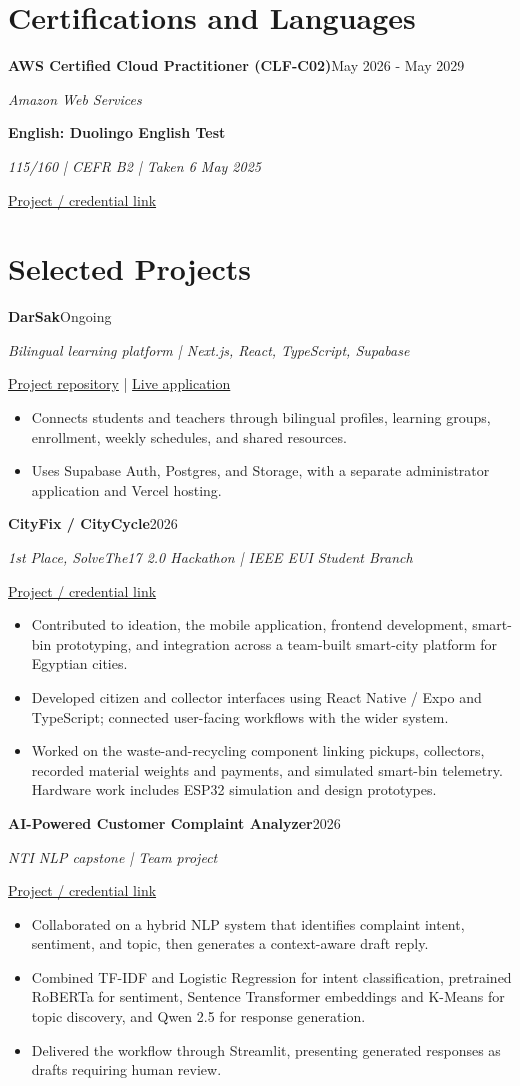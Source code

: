 \documentclass[10pt,a4paper]{article}
\newcommand{\cvitem}[3]{\par\addvspace{4pt}\textbf{#1}\hfill{\small #3}\par{\small\textit{#2}}\par}
\begin{document}
\section*{Certifications and Languages}
\cvitem{AWS Certified Cloud Practitioner (CLF-C02)}{Amazon Web Services}{May 2026 - May 2029}
\cvitem{English: Duolingo English Test}{115/160 | CEFR B2 | Taken 6 May 2025}{}
{\small\href{https://certs.duolingo.com/3nzcfz1rk1r8p002}{Project / credential link}}
\newpage
\section*{Selected Projects}
\cvitem{DarSak}{Bilingual learning platform | Next.js, React, TypeScript, Supabase}{Ongoing}
{\small\href{https://github.com/abdulrahman-111/DarSak}{Project repository} | \href{https://darsak-platform.vercel.app}{Live application}}
\begin{itemize}
\item Connects students and teachers through bilingual profiles, learning groups, enrollment, weekly schedules, and shared resources.
\item Uses Supabase Auth, Postgres, and Storage, with a separate administrator application and Vercel hosting.
\end{itemize}
\cvitem{CityFix / CityCycle}{1st Place, SolveThe17 2.0 Hackathon | IEEE EUI Student Branch}{2026}
{\small\href{https://github.com/abdulrahman-111/cityFix}{Project / credential link}}
\begin{itemize}
\item Contributed to ideation, the mobile application, frontend development, smart-bin prototyping, and integration across a team-built smart-city platform for Egyptian cities.
\item Developed citizen and collector interfaces using React Native / Expo and TypeScript; connected user-facing workflows with the wider system.
\item Worked on the waste-and-recycling component linking pickups, collectors, recorded material weights and payments, and simulated smart-bin telemetry. Hardware work includes ESP32 simulation and design prototypes.
\end{itemize}
\cvitem{AI-Powered Customer Complaint Analyzer}{NTI NLP capstone | Team project}{2026}
{\small\href{https://github.com/abdulrahman-111/NLP_customer_support_analyzer}{Project / credential link}}
\begin{itemize}
\item Collaborated on a hybrid NLP system that identifies complaint intent, sentiment, and topic, then generates a context-aware draft reply.
\item Combined TF-IDF and Logistic Regression for intent classification, pretrained RoBERTa for sentiment, Sentence Transformer embeddings and K-Means for topic discovery, and Qwen 2.5 for response generation.
\item Delivered the workflow through Streamlit, presenting generated responses as drafts requiring human review.
\end{itemize}
\end{document}
